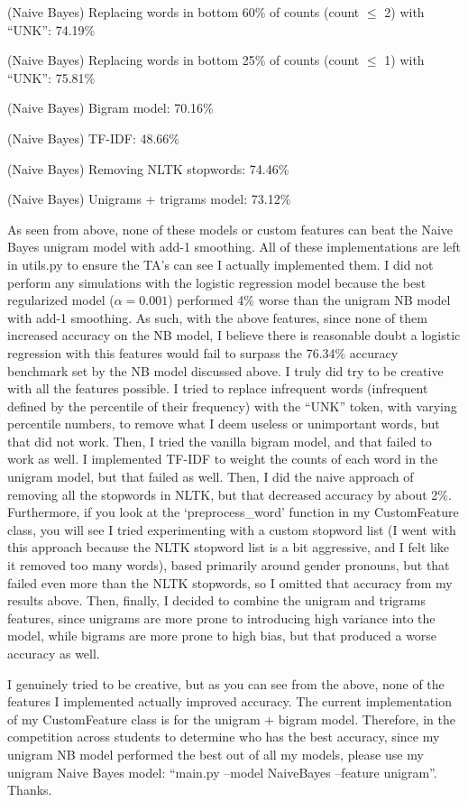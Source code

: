\begin{solution}
(Naive Bayes) Replacing words in bottom 60\% of counts (count $\leq$ 2) with ``UNK'': 74.19\%

(Naive Bayes) Replacing words in bottom 25\% of counts (count $\leq$ 1) with ``UNK'': 75.81\%

(Naive Bayes) Bigram model: 70.16\%

(Naive Bayes) TF-IDF: 48.66\%

(Naive Bayes) Removing NLTK stopwords: 74.46\%

(Naive Bayes) Unigrams + trigrams model: 73.12\%

As seen from above, none of these models or custom features can beat the Naive Bayes unigram model with add-1 smoothing. All of these implementations are left in utils.py to ensure the TA's can see I actually implemented them. I did not perform any simulations with the logistic regression model because the best regularized model ($\alpha = 0.001$) performed 4\% worse than the unigram NB model with add-1 smoothing. As such, with the above features, since none of them increased accuracy on the NB model, I believe there is reasonable doubt a logistic regression with this features would fail to surpass the 76.34\% accuracy benchmark set by the NB model discussed above. I truly did try to be creative with all the features possible. I tried to replace infrequent words (infrequent defined by the percentile of their frequency) with the ``UNK'' token, with varying percentile numbers, to remove what I deem useless or unimportant words, but that did not work. Then, I tried the vanilla bigram model, and that failed to work as well. I implemented TF-IDF to weight the counts of each word in the unigram model, but that failed as well. Then, I did the naive approach of removing all the stopwords in NLTK, but that decreased accuracy by about 2\%. Furthermore, if you look at the `preprocess\_word' function in my CustomFeature class, you will see I tried experimenting with a custom stopword list (I went with this approach because the NLTK stopword list is a bit aggressive, and I felt like it removed too many words), based primarily around gender pronouns, but that failed even more than the NLTK stopwords, so I omitted that accuracy from my results above. Then, finally, I decided to combine the unigram and trigrams features, since unigrams are more prone to introducing high variance into the model, while bigrams are more prone to high bias, but that produced a worse accuracy as well.

I genuinely tried to be creative, but as you can see from the above, none of the features I implemented actually improved accuracy. The current implementation of my CustomFeature class is for the unigram + bigram model. Therefore, in the competition across students to determine who has the best accuracy, since my unigram NB model performed the best out of all my models, please use my unigram Naive Bayes model: ``main.py --model NaiveBayes --feature unigram''. Thanks.

\end{solution}